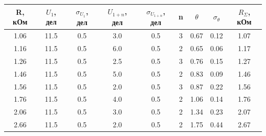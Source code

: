 \documentclass[a4paper,12pt]{article} %
\begin{document}
\begin{table}[h]
\begin{center}
\begin{tabular}{|c|c|c|c|c|c|c|c|c|}
\hline
R, кОм & $U_1$, дел & $\sigma_{U_1}$, дел   & $U_{1 + n}$, дел & $\sigma_{U_{1 + n}}$, дел  & n & $\theta$ & $\sigma_{\theta}$ & $R_{\Sigma}$, кОм   \\ \hline
1.06   & 11.5    & 0.5 & 3.0     & 0.5 & 3 & 0.67  & 0.12 & 1.07\\ \hline
1.16   & 11.5    & 0.5 & 6.0     & 0.5 & 2 & 0.65  & 0.06 & 1.17\\ \hline
1.26   & 11.5    & 0.5 & 2.5     & 0.5 & 3 & 0.76  & 0.15 & 1.27\\ \hline
1.46   & 11.5    & 0.5 & 5.0     & 0.5 & 2 & 0.83  & 0.09 & 1.46\\ \hline
1.56   & 11.5    & 0.5 & 2.0     & 0.5 & 3 & 0.87  & 0.22 & 1.56\\ \hline
1.76   & 11.5    & 0.5 & 4.0     & 0.5 & 2 & 1.06  & 0.14 & 1.76\\ \hline
2.06   & 11.5    & 0.5 & 3.0     & 0.5 & 2 & 1.34  & 0.23 & 2.07\\ \hline
2.66   & 11.5    & 0.5 & 2.0     & 0.5 & 2 & 1.75  & 0.44 & 2.67\\ \hline
\end{tabular}
\end{center}
\end{table}
\end{document}
